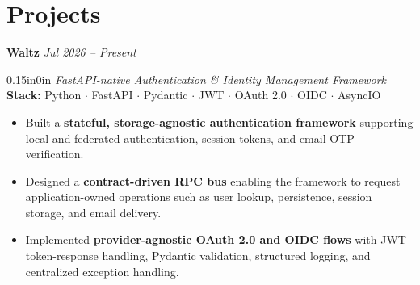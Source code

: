 \section{Projects}

\hypersetup{
    linkcolor=azure,
    filecolor=azure,
    urlcolor=azure,
}
\noindent
{\large \textbf{Waltz}} \hfill {\small \textit{Jul 2026 -- Present}}
\begin{adjustwidth}{0.15in}{0in}
    \textit{FastAPI-native Authentication \& Identity Management Framework} \\
    \textbf{Stack:} Python $\cdot$ FastAPI $\cdot$ Pydantic $\cdot$ JWT $\cdot$ OAuth 2.0 $\cdot$ OIDC $\cdot$ AsyncIO \\[2pt]
    \begin{itemize}[leftmargin=0.15in, label={--}]
        \setlength\itemsep{0em}
        \item Built a \textbf{stateful, storage-agnostic authentication framework} supporting local and federated authentication, session tokens, and email OTP verification.
        \item Designed a \textbf{contract-driven RPC bus} enabling the framework to request application-owned operations such as user lookup, persistence, session storage, and email delivery.
        \item Implemented \textbf{provider-agnostic OAuth 2.0 and OIDC flows} with JWT token-response handling, Pydantic validation, structured logging, and centralized exception handling.
    \end{itemize}
\end{adjustwidth}

\vspace{10pt}

